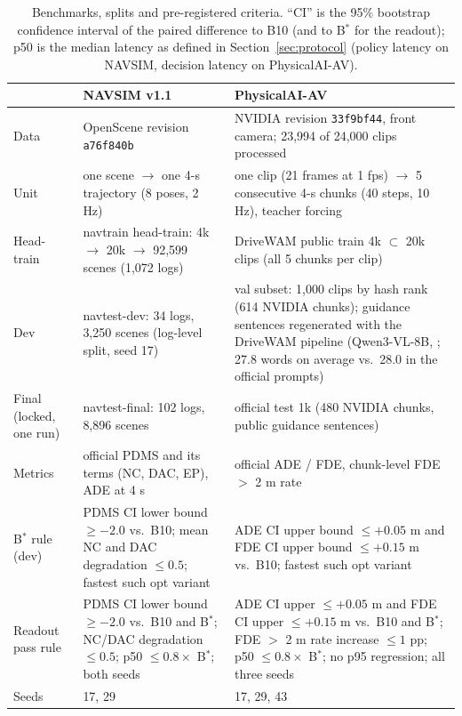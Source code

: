 \documentclass[10pt]{article}
\newcommand{\Bstar}{B$^{*}$}
\begin{document}
\begin{table}[t]
\caption{Benchmarks, splits and pre-registered criteria. ``CI'' is the 95\% bootstrap confidence interval of the paired difference to B10 (and to \Bstar{} for the readout); p50 is the median latency as defined in Section~\ref{sec:protocol} (policy latency on NAVSIM, decision latency on PhysicalAI-AV).}
\label{tab:criteria}
\begin{center}
\small
\begin{tabular}{p{2.2cm}p{5.2cm}p{6.0cm}}
\toprule
 & NAVSIM v1.1 & PhysicalAI-AV \\
\midrule
Data & OpenScene revision \texttt{a76f840b} & NVIDIA revision \texttt{33f9bf44}, front camera; 23,994 of 24,000 clips processed \\
Unit & one scene $\rightarrow$ one 4-s trajectory (8 poses, 2 Hz) & one clip (21 frames at 1 fps) $\rightarrow$ 5 consecutive 4-s chunks (40 steps, 10 Hz), teacher forcing \\
Head-train & navtrain head-train: 4k $\rightarrow$ 20k $\rightarrow$ 92,599 scenes (1,072 logs) & DriveWAM public train 4k $\subset$ 20k clips (all 5 chunks per clip) \\
Dev & navtest-dev: 34 logs, 3,250 scenes (log-level split, seed 17) & val subset: 1,000 clips by hash rank (614 NVIDIA chunks); guidance sentences regenerated with the DriveWAM pipeline (Qwen3-VL-8B, \citealp{bai2025qwen3vl}; 27.8 words on average vs.\ 28.0 in the official prompts) \\
Final (locked, one run) & navtest-final: 102 logs, 8,896 scenes & official test 1k (480 NVIDIA chunks, public guidance sentences) \\
Metrics & official PDMS and its terms (NC, DAC, EP), ADE at 4 s & official ADE / FDE, chunk-level FDE $>$ 2 m rate \\
\Bstar{} rule (dev) & PDMS CI lower bound $\ge -2.0$ vs.\ B10; mean NC and DAC degradation $\le 0.5$; fastest such opt variant & ADE CI upper bound $\le +0.05$ m and FDE CI upper bound $\le +0.15$ m vs.\ B10; fastest such opt variant \\
Readout pass rule & PDMS CI lower bound $\ge -2.0$ vs.\ B10 and \Bstar{}; NC/DAC degradation $\le 0.5$; p50 $\le 0.8 \times$ \Bstar{}; both seeds & ADE CI upper $\le +0.05$ m and FDE CI upper $\le +0.15$ m vs.\ B10 and \Bstar{}; FDE $>$ 2 m rate increase $\le 1$ pp; p50 $\le 0.8 \times$ \Bstar{}; no p95 regression; all three seeds \\
Seeds & 17, 29 & 17, 29, 43 \\
\bottomrule
\end{tabular}
\end{center}
\end{table}
\end{document}
